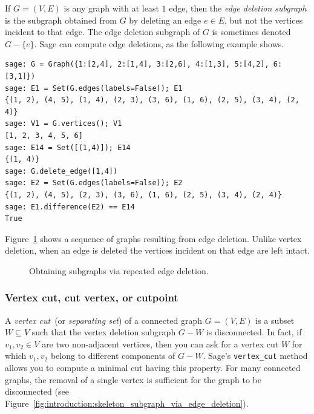If $G = (V,E)$ is any graph with at least $1$ edge, then the
\emph{edge deletion subgraph} is the subgraph obtained from $G$ by
deleting an edge $e \in E$, but not the vertices incident to that edge.
The edge deletion subgraph of $G$ is sometimes denoted $G - \{e\}$.
Sage can compute edge deletions, as the following example shows.
\begin{lstlisting}
sage: G = Graph({1:[2,4], 2:[1,4], 3:[2,6], 4:[1,3], 5:[4,2], 6:[3,1]})
sage: E1 = Set(G.edges(labels=False)); E1
{(1, 2), (4, 5), (1, 4), (2, 3), (3, 6), (1, 6), (2, 5), (3, 4), (2, 4)}
sage: V1 = G.vertices(); V1
[1, 2, 3, 4, 5, 6]
sage: E14 = Set([(1,4)]); E14
{(1, 4)}
sage: G.delete_edge([1,4])
sage: E2 = Set(G.edges(labels=False)); E2
{(1, 2), (4, 5), (2, 3), (3, 6), (1, 6), (2, 5), (3, 4), (2, 4)}
sage: E1.difference(E2) == E14
True
\end{lstlisting}
Figure~\ref{fig:introduction:edge_deletion_subgraphs} shows a sequence
of graphs resulting from edge deletion. Unlike vertex deletion, when
an edge is deleted the vertices incident on that edge are left
intact.

\begin{figure}[!htbp]
\centering

\caption{Obtaining subgraphs via repeated edge deletion.}
\label{fig:introduction:edge_deletion_subgraphs}
\end{figure}



\subsubsection{Vertex cut, cut vertex, or cutpoint}

A \emph{vertex cut}~(or
\emph{separating set}) of a connected graph
$G = (V, E)$ is a subset $W \subseteq V$ such that the vertex deletion
subgraph $G - W$ is disconnected. In fact, if $v_1, v_2 \in V$ are two
non-adjacent vertices, then you can ask for a vertex cut $W$ for which
$v_1, v_2$ belong to different components of $G - W$. Sage's
\verb!vertex_cut! method allows you to compute a minimal cut having
this property. For many connected graphs, the removal of a single
vertex is sufficient for the graph to be disconnected
(see Figure~\ref{fig:introduction:skeleton_subgraph_via_edge_deletion}).


